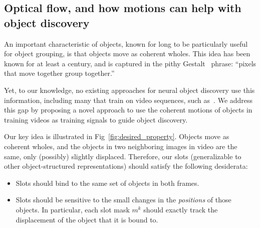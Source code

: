 \documentclass{article}
\newcommand{\jd}[1]{\textcolor{orange}{[DJ: #1]}}
\begin{document}

\subsection{Optical flow, and how motions can help with object discovery} \label{sec:flow}

An important characteristic of objects, known for long to be particularly useful for object grouping, is that objects move as coherent wholes. This idea has been known for at least a century, and is captured in the pithy Gestalt~\cite{wertheimer1938laws} phrase: ``pixels that move together group together.'' 

Yet, to our knowledge, no existing approaches for neural object discovery use this information, including many that train on video sequences, such as~\cite{racah2020slot, jakab2018unsupervised, kipf2019contrastive}. %
We address this gap by proposing a novel approach to use the coherent motions of objects in training videos as training signals to guide %
object discovery. %

Our key idea is illustrated in Fig~\ref{fig:desired_property}. Objects move as coherent wholes, and the objects in two neighboring images in video are the same, only (possibly) slightly displaced. Therefore, our slots (generalizable to other object-structured representations) should satisfy the following desiderata: %
\begin{itemize}[leftmargin=*]
 \item Slots should bind to the same set of objects in both frames. 
 \item Slots should be sensitive to the small changes in the \emph{positions} of those objects. In particular, each slot mask $m^k$ should exactly track the displacement of the object that it is bound to.
\end{itemize}
\end{document}
